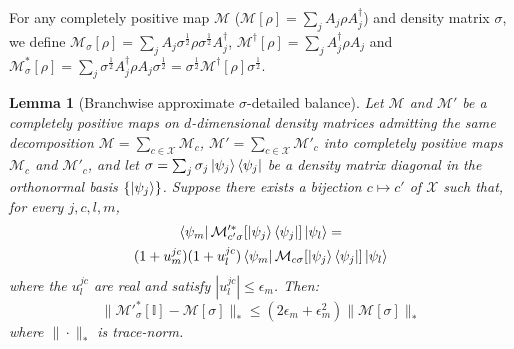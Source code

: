 \documentclass[aps,floatfix,10pt,amssymb,amsfont,amsmath,superscriptaddress,float,nofootinbib,longbibliography,nobalancelastpage,twocolumn]{revtex4-2}
\newtheorem{lemma}{Lemma}
\begin{document}
For any completely positive map $\mathcal{M}$ ($\mathcal{M}[\rho] =\sum_{j}  A_{j}\rho  A^{\dagger}_{j}$) and density matrix $\sigma$, we define $\mathcal{M}_{\sigma}[\rho] =\sum_{j}  A_{j}\sigma^{\frac{1}{2}}\rho\sigma^{\frac{1}{2}}  A^{\dagger}_{j}$, $\mathcal{M}^{\dagger}[\rho] = \sum_j A^{\dagger}_j \rho A_j$ and $ \mathcal{M}^*_{\sigma}[\rho] = \sum_{j} \sigma^{\frac{1}{2}}A^{\dagger}_{j}\rho A_{j}\sigma^{\frac{1}{2}} = \sigma^{\frac{1}{2}}\mathcal{M}^{\dagger}[\rho]\sigma^{\frac{1}{2}}$.
\begin{lemma}[Branchwise approximate $\sigma$-detailed balance]
\label{lemma:1}
Let $\mathcal{M}$ and $\mathcal{M'}$ be a completely positive maps on $d$-dimensional density matrices admitting the same decomposition $\mathcal{M} = \sum_{c\in\mathcal{X}} \mathcal{M}_c$, $\mathcal{M'} = \sum_{c\in\mathcal{X}} \mathcal{M'}_c$ into completely positive maps $\mathcal{M}_c$ and $\mathcal{M}'_c$, and let $\sigma = \sum_j \sigma_j \ket{\psi_j}\bra{\psi_j}$ be a density matrix diagonal in the orthonormal basis $\{\ket{\psi_j}\}$. Suppose there exists a bijection $c \mapsto c'$ of $\mathcal{X}$ such that, for every $j,c,l,m$,
\begin{multline}
    \bra{\psi_m}\mathcal{M}'^*_{c'\sigma}[\ket{\psi_j}\bra{\psi_j}]\ket{\psi_l}
    =\\(1+u^{jc}_m)(1+ u^{jc}_l)
    \bra{\psi_m}\mathcal{M}_{c\sigma}[\ket{\psi_j}\bra{\psi_j}]\ket{\psi_l}
    \label{eq:approximate_quantum_detailed_balance_condition}
\end{multline}
where the $u^{jc}_l$ are real and satisfy $|u^{jc}_l| \leq \epsilon_m$. Then:
 \begin{equation}
    \|\mathcal{M}'^*_{\sigma}[\mathbb{I}]-\mathcal{M}[\sigma] \|_* \leq (2\epsilon_m+\epsilon_m^2)\|\mathcal{M}[\sigma]\|_* 
\end{equation}
where $\|\cdot\|_*$ is trace-norm.
\end{lemma}
\end{document}
